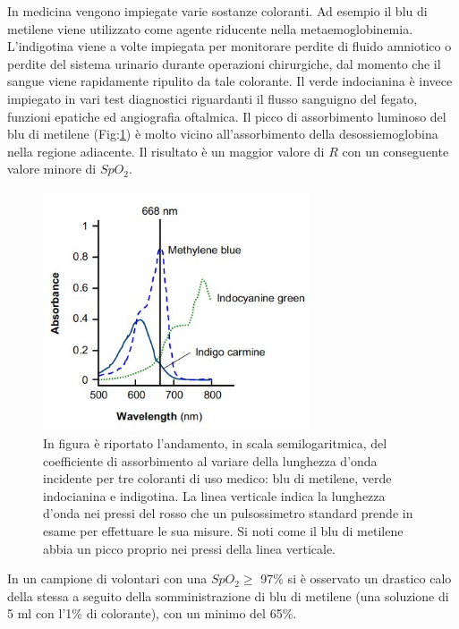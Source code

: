 \documentclass[a4paper, 12pt]{book}
\begin{document}
In medicina vengono impiegate varie sostanze coloranti.
Ad esempio il blu di metilene viene utilizzato come agente riducente nella metaemoglobinemia.
L'indigotina viene a volte impiegata per monitorare perdite di fluido amniotico o perdite del sistema urinario durante operazioni chirurgiche, dal momento che il sangue viene rapidamente ripulito da tale colorante.
Il verde indocianina è invece impiegato in vari test diagnostici riguardanti il flusso sanguigno del fegato, funzioni epatiche ed angiografia oftalmica.
Il picco di assorbimento luminoso del blu di metilene (Fig:\ref{fig:Coloranti}) è molto vicino all'assorbimento della desossiemoglobina nella regione adiacente.
Il risultato è un maggior valore di $R$ con un conseguente valore minore di $SpO_2$.
\begin{figure}[h!]
    \centering
    \includegraphics[width=0.7\textwidth]{Coloranti.jpg}
    \caption{In figura è riportato l'andamento, in scala semilogaritmica, del 							 coefficiente di assorbimento al variare della lunghezza d'onda incidente 					 per tre coloranti di uso medico: blu di metilene, verde indocianina e 						 indigotina.
    		 La linea verticale indica la lunghezza d'onda nei pressi del rosso che un 					 pulsossimetro standard prende in esame per effettuare le sua misure.
    		 Si noti come il blu di metilene abbia un picco proprio nei pressi della 					 linea verticale.}
    \label{fig:Coloranti}
\end{figure}

In un campione di volontari con una $SpO_2 \geq$ 97\% si è osservato un drastico calo della stessa a seguito della somministrazione di blu di metilene (una soluzione di 5 ml con l'1\% di colorante), con un minimo del 65\%.%
\newline
\end{document}
